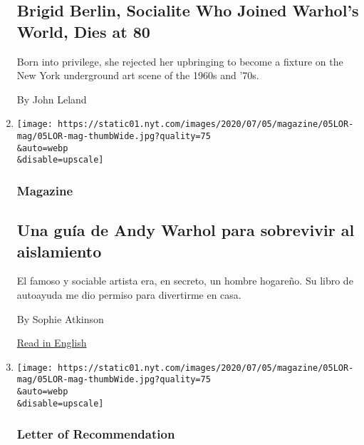 \begin{enumerate}
{  \subsection{Brigid Berlin, Socialite Who Joined Warhol's World, Dies
  at
  80}\label{brigid-berlin-socialite-who-joined-warhols-world-dies-at-80}}

  Born into privilege, she rejected her upbringing to become a fixture
  on the New York underground art scene of the 1960s and '70s.

  By John Leland
\item
  \href{/es/2020/07/02/magazine/filosofia-de-andy-warhol.html}{}

  \texttt{[image: https://static01.nyt.com/images/2020/07/05/magazine/05LOR-mag/05LOR-mag-thumbWide.jpg?quality=75\\\&auto=webp\\\&disable=upscale]}

  \hypertarget{magazine}{%
  \subsubsection{Magazine}\label{magazine}}

  \hypertarget{una-guuxeda-de-andy-warhol-para-sobrevivir-al-aislamiento}{%
  \subsection{Una guía de Andy Warhol para sobrevivir al
  aislamiento}\label{una-guuxeda-de-andy-warhol-para-sobrevivir-al-aislamiento}}

  El famoso y sociable artista era, en secreto, un hombre hogareño. Su
  libro de autoayuda me dio permiso para divertirme en casa.

  By Sophie Atkinson

  \href{https://www.nytimes.com/2020/06/30/magazine/the-philosophy-of-andy-warhol.html}{Read
  in English}
\item
  \href{/2020/06/30/magazine/the-philosophy-of-andy-warhol.html}{}

  \texttt{[image: https://static01.nyt.com/images/2020/07/05/magazine/05LOR-mag/05LOR-mag-thumbWide.jpg?quality=75\\\&auto=webp\\\&disable=upscale]}

  \hypertarget{letter-of-recommendation}{%
  \subsubsection{Letter of
  Recommendation}\label{letter-of-recommendation}}

  \hypertarget{andy-warhols-secrets-for-surviving-isolation}{%
}
\end{enumerate}

